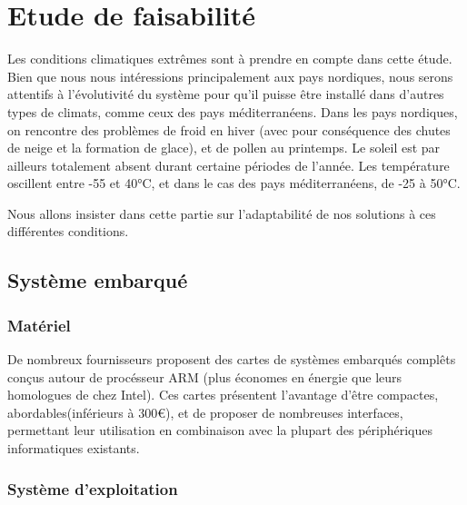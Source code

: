 \section{Etude de faisabilité}

Les conditions climatiques extrêmes sont à prendre en compte dans cette étude. Bien que nous nous intéressions principalement aux pays nordiques, nous serons attentifs à l’évolutivité du système pour qu’il puisse être installé dans d'autres types de climats, comme ceux des pays méditerranéens.
Dans les pays nordiques, on rencontre des problèmes de froid en hiver (avec pour conséquence des chutes de neige et la formation de glace), et de pollen au printemps. Le soleil est par ailleurs totalement absent durant certaine périodes de l’année. 
Les température oscillent entre -55 et 40°C, et dans le cas des pays méditerranéens, de -25 à 50°C.

Nous allons insister dans cette partie sur l'adaptabilité de nos solutions à ces différentes conditions.


\subsection{Système embarqué}

\subsubsection{Matériel}

De nombreux fournisseurs proposent des cartes de systèmes embarqués complêts conçus autour de procésseur ARM (plus économes en énergie que leurs homologues de chez Intel). Ces cartes présentent l'avantage d'être compactes, abordables\footnotemark (inférieurs à 300\euro ), et de proposer de nombreuses interfaces, permettant leur utilisation en combinaison avec la plupart des périphériques informatiques existants.


\subsubsection{Système d'exploitation}

